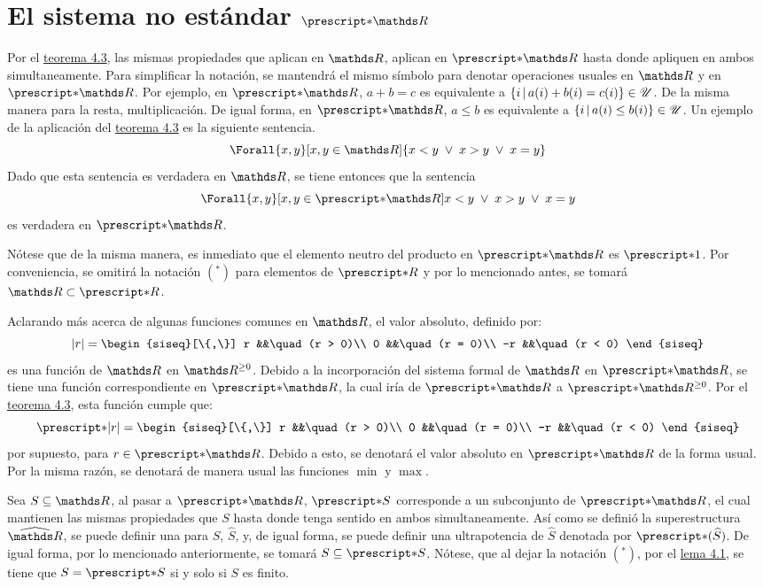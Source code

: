 \section{El sistema no estándar \texorpdfstring{$\st{\R}$}{R}}

Por el \hyperref[theo:FT]{teorema 4.3}, las mismas propiedades que aplican
en $\R$, aplican en $\st{\R}$ hasta donde apliquen en ambos simultaneamente.
Para simplificar la notación, se mantendrá el mismo símbolo para
denotar operaciones usuales en $\R$ y en $\st{\R}$.
Por ejemplo, en $\st{\R}$, $a + b = c$ es equivalente a
$\left\{i\,\middle|\,a(i) + b(i) = c(i)\right\}\in\mathscr{U}$. De la misma manera para la
resta, multiplicación. De igual forma, en $\st{\R}$, $a \leq b$ es
equivalente a $\left\{i\,\middle|\,a(i)\leq b(i)\right\}\in\mathscr{U}$. Un ejemplo de la
aplicación del \hyperref[theo:FT]{teorema 4.3} es la siguiente sentencia.
\[\Forall{x,y}[x,y\in\R]{x<y \;\lor\; x>y \;\lor\; x=y}\]
Dado que esta sentencia es verdadera en $\R$, se tiene entonces que la
sentencia
\[\Forall{x,y}[x,y\in\st{\R}]{x<y \;\lor\; x>y \;\lor\; x=y}\]
es verdadera en $\st{\R}$.

Nótese que de la misma manera, es inmediato que el elemento neutro del
producto en $\st{\R}$ es $\st{1}$. Por conveniencia, se omitirá la notación
$({^*})$ para elementos de $\st{R}$ y por lo mencionado antes,
se tomará $\R \subset \st{R}$.

Aclarando más acerca de algunas funciones comunes en $\R$, el valor
absoluto, definido por:
\[
  |r| =
  \begin{siseq}[\{,\}]
    r   &&\quad (r > 0)\\
    0   &&\quad (r = 0)\\
    -r  &&\quad (r < 0)
  \end{siseq}
\]
es una función de $\R$ en $\R^{\geq 0}$. Debido a la incorporación
del sistema formal de $\R$ en $\st{\R}$, se tiene una función
correspondiente en $\st{\R}$, la cual iría de $\st{\R}$ a
$\st{\R^{\geq 0}}$. Por el \hyperref[theo:FT]{teorema 4.3}, esta función
cumple que:
\[
  \st{|r|} =
  \begin{siseq}[\{,\}]
    r   &&\quad (r > 0)\\
    0   &&\quad (r = 0)\\
    -r  &&\quad (r < 0)
  \end{siseq}
\]
por supuesto, para $r\in\st{\R}$. Debido a esto, se denotará el valor
absoluto en $\st{\R}$ de la forma usual. Por la misma razón, se denotará
de manera usual las funciones $\min$ y $\max$.

Sea $S\subseteq\R$, al pasar a $\st{\R}$, $\st{S}$ corresponde a un
subconjunto de $\st{\R}$, el cual mantienen las mismas propiedades que $S$
hasta donde tenga sentido en ambos simultaneamente. Así como se definió
la superestructura $\Rh$, se puede definir una para $S$, $\widehat{S}$, y,
de igual forma, se puede definir una ultrapotencia de $\widehat{S}$ denotada
por $\st{(\widehat{S})}$. De igual forma, por lo mencionado anteriormente,
se tomará $S\subseteq\st{S}$. Nótese, que al dejar la notación $({^*})$,
por el \hyperref[lema:stR]{lema 4.1}, se tiene que $S=\st{S}$ si y solo
si $S$ es finito.

